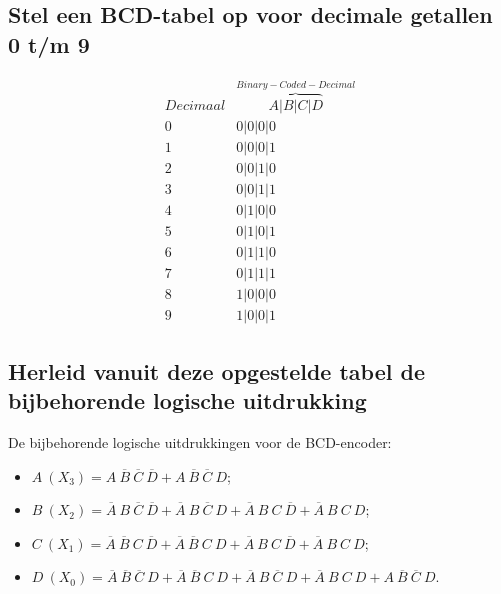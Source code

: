 \documentclass[12pt]{article}
\begin{document}
\subsection{Stel een BCD-tabel op voor decimale getallen 0 t/m 9}
\begin{displaymath}
    \begin{array}{|c||c|c|c|c|}
    Decimaal & \overbrace{A|B|C|D}^{Binary-Coded-Decimal} \\
    \hline 
    0 & 0 | 0 | 0 | 0 \\
    1 & 0 | 0 | 0 | 1 \\
    2 & 0 | 0 | 1 | 0 \\
    3 & 0 | 0 | 1 | 1 \\
    4 & 0 | 1 | 0 | 0 \\
    5 & 0 | 1 | 0 | 1 \\
    6 & 0 | 1 | 1 | 0 \\
    7 & 0 | 1 | 1 | 1 \\
    8 & 1 | 0 | 0 | 0 \\
    9 & 1 | 0 | 0 | 1
    \end{array}
    \end{displaymath}
\subsection{Herleid vanuit deze opgestelde tabel de bijbehorende logische uitdrukking}
De bijbehorende logische uitdrukkingen voor de BCD-encoder:
\begin{itemize}
    \item $A\ (X_3)=A\ \overline{B}\ \overline{C}\ \overline{D} + A\ \overline{B}\ \overline{C}\ D$;
    \item $B\ (X_2)=\overline{A}\ B\ \overline{C}\ \overline{D} + \overline{A}\ B\ \overline{C}\ D + \overline{A}\ B\ C\ \overline{D} + \overline{A}\ B\ C\ D$;
    \item $C\ (X_1)=\overline{A}\ \overline{B}\ C\ \overline{D} + \overline{A}\ \overline{B}\ C\ D + \overline{A}\ B\ C\ \overline{D} + \overline{A}\ B\ C\ D$;
    \item $D\ (X_0)=\overline{A}\ \overline{B}\ \overline{C}\ D + \overline{A}\ \overline{B}\ C\ D + \overline{A}\ B\ \overline{C}\ D+ \overline{A}\ B\ C\ D + A\ \overline{B}\ \overline{C}\ D$.
\end{itemize}
\pagebreak
\end{document}
